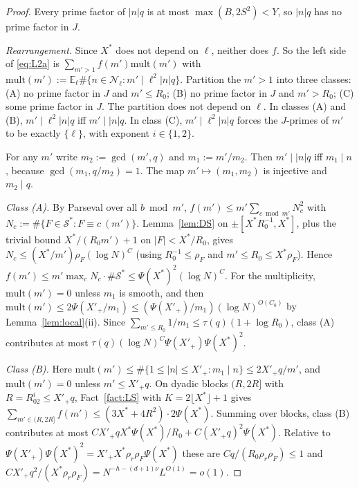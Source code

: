 \documentclass[11pt]{amsart}
\theoremstyle{definition}
\newcommand{\cN}{\mathcal{N}}
\newcommand{\cS}{\mathcal{S}}
\newcommand{\XF}{X^{*}}
\newcommand{\rr}{\rho_r}
\newcommand{\rF}{\rho_F}
\newcommand{\Ex}{\mathbb{E}}
\begin{document}
\begin{proof}
Every prime factor of $|n|q$ is at most $\max(B,2S^2)<Y$, so $|n|q$ has no prime factor in $J$.

\emph{Rearrangement.} Since $\XF$ does not depend on $\ell$, neither does $f$. So the left side of \eqref{eq:L2a} is
$\sum_{m'>1}f(m')\mathrm{mult}(m')$ with $\mathrm{mult}(m'):=\Ex_\ell\#\{n\in\cN_\ell:m'\mid\ell^2|n|q\}$. Partition the $m'>1$ into three classes:
(A) no prime factor in $J$ and $m'\le R_0$; (B) no prime factor in $J$ and $m'>R_0$; (C) some prime factor in $J$. The partition does
not depend on $\ell$. In classes (A) and (B), $m'\mid\ell^2|n|q$ iff $m'\mid|n|q$. In class (C), $m'\mid\ell^2|n|q$ forces the
$J$-primes of $m'$ to be exactly $\{\ell\}$, with exponent $i\in\{1,2\}$.

For any $m'$ write $m_2:=\gcd(m',q)$ and $m_1:=m'/m_2$. Then $m'\mid|n|q$ iff $m_1\mid n$, because $\gcd(m_1,q/m_2)=1$. The map
$m'\mapsto(m_1,m_2)$ is injective and $m_2\mid q$.

\emph{Class (A).} By Parseval over all $b\bmod m'$, $f(m')\le m'\sum_{c\bmod m'}N_c^2$ with $N_c:=\#\{F\in\cS^*:F\equiv c\ (m')\}$. Lemma~\ref{lem:DS}
on $\pm[\XF R_0^{-1},\XF]$, plus the trivial bound $\XF/(R_0m')+1$ on $|F|<\XF/R_0$, gives $N_c\le(\XF/m')\rF(\log N)^C$ (using
$R_0^{-1}\le\rF$ and $m'\le R_0\le\XF\rF$). Hence $f(m')\le m'\max_cN_c\cdot\#\cS^*\le\Psi(\XF)^2(\log N)^C$. For the multiplicity,
$\mathrm{mult}(m')=0$ unless $m_1$ is smooth, and then $\mathrm{mult}(m')\le2\Psi(X'_+/m_1)\le(\Psi(X'_+)/m_1)(\log N)^{O(C_0)}$ by Lemma~\ref{lem:local}(ii).
Since $\sum_{m'\le R_0}1/m_1\le\tau(q)(1+\log R_0)$, class (A) contributes at most $\tau(q)(\log N)^C\Psi(X'_+)\Psi(\XF)^2$.

\emph{Class (B).} Here $\mathrm{mult}(m')\le\#\{1\le|n|\le X'_+:m_1\mid n\}\le2X'_+q/m'$, and $\mathrm{mult}(m')=0$ unless $m'\le X'_+q$. On dyadic blocks
$(R,2R]$ with $R=R_02^i\le X'_+q$, Fact~\ref{fact:LS} with $K=2\lfloor\XF\rfloor+1$ gives
$\sum_{m'\in(R,2R]}f(m')\le(3\XF+4R^2)\cdot2\Psi(\XF)$. Summing over blocks, class (B) contributes at most
$C X'_+q\XF\Psi(\XF)/R_0+C(X'_+q)^2\Psi(\XF)$. Relative to $\Psi(X'_+)\Psi(\XF)^2=X'_+\XF\rr\rF\Psi(\XF)$ these are $Cq/(R_0\rr\rF)\le1$ and
$CX'_+q^2/(\XF\rr\rF)=N^{-h-(d+1)\nu}L^{O(1)}=o(1)$.


\end{proof}
\end{document}
